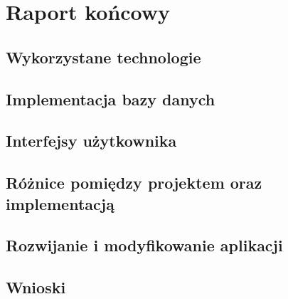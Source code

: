 \chapter{Raport końcowy}
\label{cha:raport}

\section{Wykorzystane technologie}
\label{sec:technologie}



\section{Implementacja bazy danych}
\label{sec:impldb}



\section{Interfejsy użytkownika}
\label{sec:interfejsy}



\section{Różnice pomiędzy projektem oraz implementacją}
\label{sec:roznice}



\section{Rozwijanie i modyfikowanie aplikacji}
\label{sec:rozwoj}



\section{Wnioski}
\label{sec:doswiadczenia}

